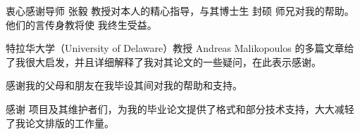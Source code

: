 \begin{acknowledgement}
  衷心感谢导师 张毅 教授对本人的精心指导，与其博士生 封硕 师兄对我的帮助。他们的言传身教将使
  我终生受益。

  特拉华大学（University of Delaware）教授 Andreas Malikopoulos 的多篇文章给了我很大启发，并且详细解释了我对其论文的一些疑问，在此表示感谢。

  感谢我的父母和朋友在我毕设其间对我的帮助和支持。

  感谢 \thuthesis 项目及其维护者们，为我的毕业论文提供了格式和部分技术支持，大大减轻了我论文排版的工作量。
\end{acknowledgement}
